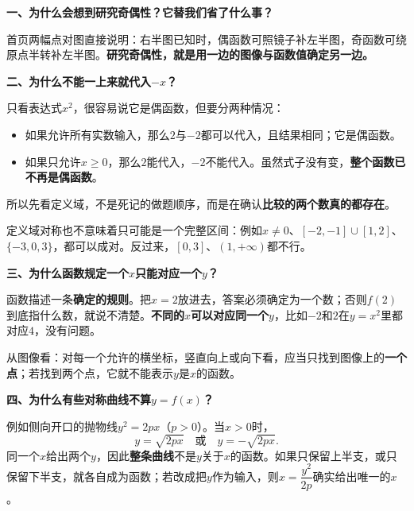 \clearpage
\begin{explanationbox}
\textbf{一、为什么会想到研究奇偶性？它替我们省了什么事？}

首页两幅点对图直接说明：右半图已知时，偶函数可照镜子补左半图，奇函数可绕原点半转补左半图。\textbf{研究奇偶性，就是用一边的图像与函数值确定另一边。}

\medskip
\textbf{二、为什么不能一上来就代入$-x$？}



只看表达式$x^2$，很容易说它是偶函数，但要分两种情况：
\begin{itemize}[leftmargin=*,itemsep=0.3em]
\item 如果允许所有实数输入，那么$2$与$-2$都可以代入，且结果相同；它是偶函数。
\item 如果只允许$x\geq0$，那么$2$能代入，$-2$不能代入。虽然式子没有变，\textbf{整个函数已不再是偶函数}。
\end{itemize}
所以先看定义域，不是死记的做题顺序，而是在确认\textbf{比较的两个数真的都存在}。

定义域对称也不意味着只可能是一个完整区间：例如$x\ne0$、$[-2,-1]\cup[1,2]$、$\{-3,0,3\}$，都可以成对。反过来，$[0,3]$、$(1,+\infty)$都不行。

\medskip
\end{explanationbox}
\clearpage
\begin{explanationbox}
\textbf{三、为什么函数规定一个$x$只能对应一个$y$？}

函数描述一条\textbf{确定的规则}。把$x=2$放进去，答案必须确定为一个数；否则$f(2)$到底指什么数，就说不清楚。\textbf{不同的$x$可以对应同一个$y$}，比如$-2$和$2$在$y=x^2$里都对应$4$，没有问题。


\begin{center}

\end{center}


从图像看：对每一个允许的横坐标，竖直向上或向下看，应当只找到图像上的\textbf{一个点}；若找到两个点，它就不能表示$y$是$x$的函数。

\medskip
\end{explanationbox}
\clearpage
\begin{explanationbox}
\textbf{四、为什么有些对称曲线不算$y=f(x)$？}

例如侧向开口的抛物线$y^2=2px$（$p>0$）。当$x>0$时，
\[y=\sqrt{2px}\quad\text{或}\quad y=-\sqrt{2px}.\]
同一个$x$给出两个$y$，因此\textbf{整条曲线}不是$y$关于$x$的函数。如果只保留上半支，或只保留下半支，就各自成为函数；若改成把$y$作为输入，则$x=\dfrac{y^2}{2p}$确实给出唯一的$x$。


\begin{center}

\end{center}



\medskip
\end{explanationbox}
